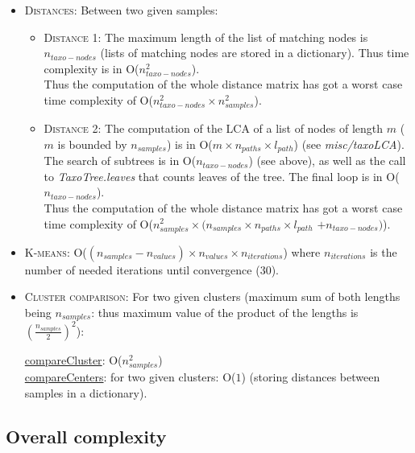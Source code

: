 \documentclass{report}
\begin{document}
\begin{itemize}
\item \textsc{Distances:} Between two given samples:\\

\begin{itemize}
\item \textsc{Distance 1:} The maximum length of the list of matching nodes is $n_{taxo-nodes}$ (lists of matching nodes are stored in a dictionary). Thus time complexity is in O($n_{taxo-nodes}^{2}$).\\

Thus the computation of the whole distance matrix has got a worst case time complexity of O($n_{taxo-nodes}^{2} \times n_{samples}^{2}$).

\item \textsc{Distance 2:} The computation of the LCA of a list of nodes of length $m$ ($m$ is bounded by $n_{samples}$) is in O($m \times n_{paths} \times l_{path}$) (see \emph{misc/taxoLCA}). The search of subtrees is in O($n_{taxo-nodes}$) (see above), as well as the call to \emph{TaxoTree.leaves} that counts leaves of the tree. The final loop is in O($n_{taxo-nodes}$).\\

Thus the computation of the whole distance matrix has got a worst case time complexity of O($n_{samples}^{2} \times (n_{samples} \times n_{paths} \times l_{path}$ \-$+ n_{taxo-nodes})$).

\end{itemize}

\item \textsc{K-means:} O($(n_{samples} - n_{values}) \times n_{values} \times n_{iterations}$) where $n_{iterations}$ is the number of needed iterations until convergence (30).

\item \textsc{Cluster comparison:} For two given clusters (maximum sum of both lengths being $n_{samples}$: thus maximum value of the product of the lengths is $(\frac{n_{samples}}{2})^{2}$):

\uline{compareCluster}: O($n_{samples}^{2}$)\\

\uline{compareCenters}: for two given clusters: O($1$) (storing distances between samples in a dictionary).\\

\end{itemize}

\subsection{Overall complexity}
\end{document}
